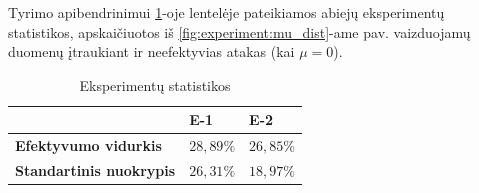 Tyrimo apibendrinimui \ref{tab:experiment:stats}-oje lentelėje pateikiamos abiejų eksperimentų statistikos, apskaičiuotos iš \ref{fig:experiment:mu_dist}-ame pav. vaizduojamų duomenų įtraukiant ir neefektyvias atakas (kai $\mu = 0$).

\begin{table}[h]
    \centering
    \begin{tabular}{l|l|l}
                                        & \textbf{E-1} & \textbf{E-2} \\
        \midrule
        \textbf{Efektyvumo vidurkis}    & $28,89\%$    & $26,85\%$    \\
        \textbf{Standartinis nuokrypis} & $26,31\%$    & $18,97\%$    \\
    \end{tabular}
    \caption{Eksperimentų statistikos}\label{tab:experiment:stats}
\end{table}
